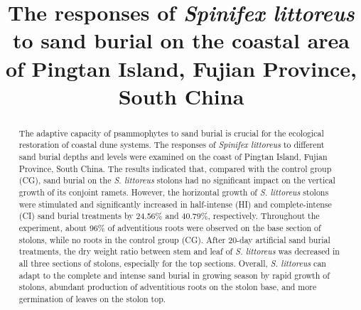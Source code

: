 \documentclass[]{interact}
\theoremstyle{plain}%
\theoremstyle{definition}
\theoremstyle{remark}
\begin{document}
\linenumbers
{}%

\title{The responses of \textit{\textit{Spinifex littoreus}} to sand burial on the coastal area of Pingtan Island, Fujian Province, South China}

\author{
}

\maketitle

\begin{abstract}
\label{abstract}
The adaptive capacity of psammophytes to sand burial is crucial for the ecological restoration of coastal dune systems. 
The responses of \textit{Spinifex littoreus} to different sand burial depths and levels were examined on the coast of Pingtan Island, Fujian Province, South China. 
The results indicated that, compared with the control group (CG), sand burial on the \textit{S. littoreus} stolons had no significant impact on the vertical growth of its conjoint ramets. 
However, the horizontal growth of \textit{S. littoreus} stolons were stimulated and significantly increased in half-intense (HI) and complete-intense (CI) sand burial treatments by 24.56\% and 40.79\%, respectively. 
Throughout the experiment, about 96\% of adventitious roots were observed on the base section of stolons, while no roots in the control group (CG). 
After 20-day artificial sand burial treatments, the dry weight ratio between stem and leaf of \textit{S. littoreus} was decreased in all three sections of stolons, especially for the top sections. 
Overall, \textit{S. littoreus} can adapt to the complete and intense sand burial in growing season by rapid growth of stolons, abundant production of adventitious roots on the stolon base, and more germination of leaves on the stolon top.
\end{abstract}
\end{document}

